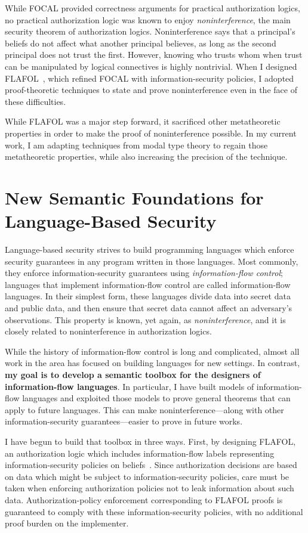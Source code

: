 \documentclass{article}
\theoremstyle{definition}
\begin{document}
While FOCAL provided correctness arguments for practical authorization logics, no practical authorization logic was known to enjoy \emph{noninterference}, the main security theorem of authorization logics.
Noninterference says that a principal's beliefs do not affect what another principal believes, as long as the second principal does not trust the first.
However, knowing who trusts whom when trust can be manipulated by logical connectives is highly nontrivial.
When I designed FLAFOL~\citep{HirschACAT20}, which refined FOCAL with information-security policies, I adopted proof-theoretic techniques to state and prove noninterference even in the face of these difficulties.

While FLAFOL was a major step forward, it sacrificed other metatheoretic properties in order to make the proof of noninterference possible.
In my current work, I am adapting techniques from modal type theory to regain those metatheoretic properties, while also increasing the precision of the technique.

\section*{New Semantic Foundations for Language-Based Security}

Language-based security strives to build programming languages which enforce security guarantees in any program written in those languages.
Most commonly, they enforce information-security guarantees using \emph{information-flow control}; languages that implement information-flow control are called information-flow languages.
In their simplest form, these languages divide data into secret data and public data, and then ensure that secret data cannot affect an adversary's observations.
This property is known, yet again, as \emph{noninterference}, and it is closely related to noninterference in authorization logics.

While the history of information-flow control is long and complicated, almost all work in the area has focused on building languages for new settings.
In contrast, \textbf{my goal is to develop a semantic toolbox for the designers of information-flow languages}.
In particular, I have built models of information-flow languages and exploited those models to prove general theorems that can apply to future languages.
This can make noninterference---along with other information-security guarantees---easier to prove in future works.

I have begun to build that toolbox in three ways.
First, by designing FLAFOL, an authorization logic which includes information-flow labels representing information-security policies on beliefs~\citep{HirschACAT20}.
Since authorization decisions are based on data which might be subject to information-security policies, care must be taken when enforcing authorization policies not to leak information about such data.
Authorization-policy enforcement corresponding to FLAFOL proofs is guaranteed to comply with these information-security policies, with no additional proof burden on the implementer.
\end{document}
